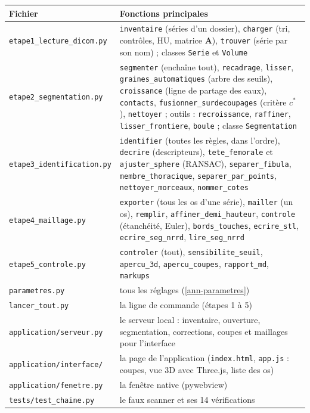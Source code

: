 \documentclass[11pt,a4paper]{article}
\newcommand{\fichier}[1]{\texttt{\small #1}}
\newcommand{\vb}[1]{\mathbf{#1}}
\begin{document}
\begin{longtable}{p{4.2cm}p{11cm}}
\toprule
\textbf{Fichier} & \textbf{Fonctions principales} \\
\midrule
\endhead
\fichier{etape1\_lecture\_dicom.py} & \texttt{inventaire} (séries d'un dossier), \texttt{charger} (tri, contrôles, HU,
matrice $\vb{A}$), \texttt{trouver} (série par son nom) ; classes \texttt{Serie} et \texttt{Volume} \\
\fichier{etape2\_segmentation.py} & \texttt{segmenter} (enchaîne tout), \texttt{recadrage}, \texttt{lisser},
\texttt{graines\_automatiques} (arbre des seuils), \texttt{croissance} (ligne de partage des eaux),
\texttt{contacts}, \texttt{fusionner\_surdecoupages} (critère $c^*$), \texttt{nettoyer} ; outils :
\texttt{recroissance}, \texttt{raffiner}, \texttt{lisser\_frontiere}, \texttt{boule} ; classe \texttt{Segmentation} \\
\fichier{etape3\_identification.py} & \texttt{identifier} (toutes les règles, dans l'ordre), \texttt{decrire}
(descripteurs), \texttt{tete\_femorale} et \texttt{ajuster\_sphere} (RANSAC), \texttt{separer\_fibula},
\texttt{membre\_thoracique}, \texttt{separer\_par\_points}, \texttt{nettoyer\_morceaux}, \texttt{nommer\_cotes} \\
\fichier{etape4\_maillage.py} & \texttt{exporter} (tous les os d'une série), \texttt{mailler} (un os),
\texttt{remplir}, \texttt{affiner\_demi\_hauteur}, \texttt{controle} (étanchéité, Euler), \texttt{bords\_touches},
\texttt{ecrire\_stl}, \texttt{ecrire\_seg\_nrrd}, \texttt{lire\_seg\_nrrd} \\
\fichier{etape5\_controle.py} & \texttt{controler} (tout), \texttt{sensibilite\_seuil}, \texttt{apercu\_3d},
\texttt{apercu\_coupes}, \texttt{rapport\_md}, \texttt{markups} \\
\fichier{parametres.py} & tous les réglages (\cref{ann-parametres}) \\
\fichier{lancer\_tout.py} & la ligne de commande (étapes 1 à 5) \\
\fichier{application/serveur.py} & le serveur local : inventaire, ouverture, segmentation, corrections, coupes et
maillages pour l'interface \\
\fichier{application/interface/} & la page de l'application (\fichier{index.html}, \fichier{app.js} : coupes, vue
3D avec Three.js, liste des os) \\
\fichier{application/fenetre.py} & la fenêtre native (pywebview) \\
\fichier{tests/test\_chaine.py} & le faux scanner et ses 14 vérifications \\

\end{longtable}
\end{document}
